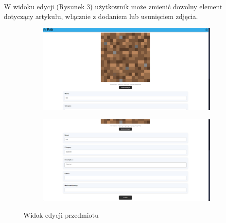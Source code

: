 \documentclass[../main.tex]{subfiles}
\begin{document}
            W widoku edycji (Rysunek \ref{fig:app-items-edit-desktop}) użytkownik może zmienić dowolny element dotyczący artykułu, włącznie z dodaniem lub usunięciem zdjęcia.
            \begin{figure}[H]
                \begin{subfigure}{.49\textwidth}
                    \centering
                    \includegraphics[width=\getImageWidth]{images/app-desktop/app-items-edit1-desktop.png}
                    \label{fig:app-items-edit1-desktop}
                \end{subfigure}
                \begin{subfigure}{.49\textwidth}
                    \centering
                    \includegraphics[width=\getImageWidth]{images/app-desktop/app-items-edit2-desktop.png}
                    \label{fig:app-items-edit2-desktop}
                \end{subfigure}
                \caption{Widok edycji przedmiotu}
                \label{fig:app-items-edit-desktop}
            \end{figure}
            
\end{document}
